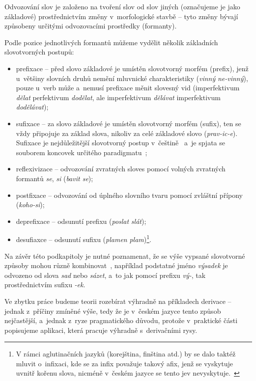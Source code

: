 Odvozování slov je založeno na tvoření slov od slov jiných (označujeme
je jako základové) prostřednictvím změny v~morfologické stavbě -- tyto
změny bývají způsobeny určitými odvozovacími prostředky (formanty).
\parencite[93]{dokulil00}

Podle pozice jednotlivých formantů můžeme vydělit několik základních
slovotvorných postupů:

\begin{itemize}
\tightlist
\item
  prefixace -- před slovo základové je umístěn slovotvorný morfém
  (prefix), jenž u~většiny slovních druhů nemění mluvnické
  charakteristiky (\emph{vinný} \rigtharrow \emph{ne-vinný}), pouze
  u~verb může a~nemusí prefixace měnit slovesný vid (imperfektivum
  \emph{dělat} \rigtharrow perfektivum \emph{dodělat}, ale
  imperfektivum \emph{dělávat} \rigtharrow imperfektivum
  \emph{dodělávat});
\item
  sufixace -- za slovo základové je umístěn slovotvorný morfém (sufix),
  ten se vždy připojuje za základ slova, nikoliv za celé základové slovo
  (\emph{prav-ic-e}). Sufixace je nejdůležitější slovotvorný postup
v~češtině~\parencite[23]{dokulil62} a~je spjata se souborem koncovek
  určitého paradigmatu~\parencite[93]{dokulil00};
\item
  reflexivizace -- odvozování zvratných sloves pomocí volných zvratných
  formantů \emph{se}, \emph{si} (\emph{bavit se});
\item
  postfixace -- odvozování od úplného slovního tvaru pomocí zvláštní
  přípony (\emph{koho-si});
\item
  deprefixace -- odsunutí prefixu (\emph{poslat} \rigtharrow
  \emph{slát});
\item
  desufiaxce -- odsunutí sufixu (\emph{plamen} \rigtharrow
  \emph{plam})\footnote{V rámci aglutinačních jazyků (korejština, finština atd.) by se dalo taktéž mluvit o~infixaci, kde se za infix považuje takový afix, jenž se vyskytuje uvnitř kořenu slova, nicméně v~českém jazyce se tento jev nevyskytuje.~\parencite{enc-morfem17}}.
 ~\parencite[93--94]{dokulil00}
\end{itemize}

Na závěr této podkapitoly je nutné poznamenat, že se výše vypsané
slovotvorné způsoby mohou různě kombinovat~\parencite[93]{dokulil00},
například podstatné jméno \emph{výsadek} je odvozeno od slova \emph{sad}
nebo \emph{sázet}, a~to jak pomocí prefixu \emph{vý-}, tak
prostřednictvím sufixu \emph{-ek}.

Ve zbytku práce budeme teorii rozebírat výhradně na příkladech derivace
-- jednak z~příčiny zmíněné výše, tedy že je v~českém jazyce tento
způsob nejčastější, a~jednak z~ryze pragmatického důvodu, protože
v~praktické části popisujeme aplikaci, která pracuje výhradně
s~derivačními rysy.


